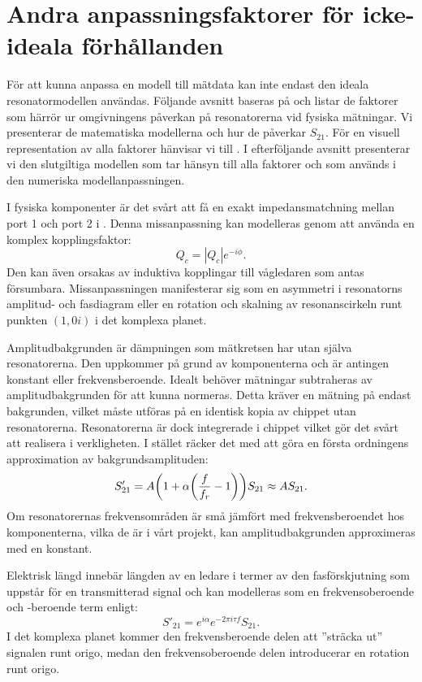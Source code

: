 \documentclass[main.tex]{subfiles}
\begin{document}
\section{Andra anpassningsfaktorer för icke-ideala förhållanden}
\label{sec:omgivning}
För att kunna anpassa en modell till mätdata kan inte endast den ideala resonatormodellen användas. Följande avsnitt baseras på \cite{Boehme2016,Probst2015} och listar de faktorer som härrör ur omgivningens påverkan på resonatorerna vid fysiska mätningar. Vi presenterar de matematiska modellerna och hur de påverkar $S_{21}$. För en visuell representation av alla faktorer hänvisar vi till \cite[fig. 3]{Probst2015}. I efterföljande avsnitt presenterar vi den slutgiltiga modellen som tar hänsyn till alla faktorer och som används i den numeriska modellanpassningen.

I fysiska komponenter är det svårt att få en exakt impedansmatchning mellan port 1 och port 2 i . Denna missanpassning kan modelleras genom att använda en komplex kopplingsfaktor:
\begin{equation}
    Q_c=|Q_c|e^{-i\phi}.
\end{equation}
Den kan även orsakas av induktiva kopplingar till vågledaren som antas försumbara. Missanpassningen manifesterar sig som en asymmetri i resonatorns amplitud- och fasdiagram eller en rotation och skalning av resonanscirkeln runt punkten $(1,0i)$ i det komplexa planet.

Amplitudbakgrunden är dämpningen som mätkretsen har utan själva resonatorerna. Den uppkommer på grund av komponenterna och är antingen konstant eller frekvensberoende.
Idealt behöver mätningar subtraheras av amplitudbakgrunden för att kunna normeras. Detta kräver en mätning på endast bakgrunden, vilket måste utföras på en identisk kopia av chippet utan resonatorerna. Resonatorerna är dock integrerade i chippet vilket gör det svårt att realisera i verkligheten. I stället räcker det med att göra en första ordningens approximation av bakgrundsamplituden:
\begin{equation}
    S'_{21} = A\qty(1+\alpha\qty(\frac{f}{f_r}-1))S_{21} \approx A S_{21}.
\end{equation}
Om resonatorernas frekvensområden är små jämfört med frekvensberoendet hos komponenterna, vilka de är i vårt projekt, kan amplitudbakgrunden approximeras med en konstant.

Elektrisk längd innebär längden av en ledare i termer av den fasförskjutning som uppstår för en transmitterad signal \cite{Schmitt2002} och kan modelleras som en frekvensoberoende och -beroende term enligt:
\begin{equation}
    S'_{21} = e^{i\alpha}e^{-2\pi i\tau f}S_{21}.
\end{equation}
I det komplexa planet kommer den frekvensberoende delen att ''sträcka ut'' signalen runt origo, medan den frekvensoberoende delen introducerar en rotation runt origo.
\end{document}
